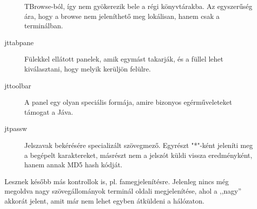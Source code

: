 \begin{description}
    TBrowse-ból, így nem gyökerezik bele a régi könyvtárakba.
    Az egyszerűség ára, hogy a browse nem jeleníthető meg lokálisan,
    hanem csak a terminálban.
\item[jttabpane]
    Fülekkel ellátott panelek, amik egymást takarják, és
    a füllel lehet kiválasztani, hogy melyik kerüljön felülre.
\item[jttoolbar]
    A panel egy olyan speciális formája, amire bizonyos 
    egérműveleteket támogat a Jáva.
\item[jtpassw]
    Jelszavak bekérésére specializált szövegmező. Egyrészt
    "*"-ként jeleníti meg a begépelt karaktereket, másrészt nem
    a jelszót küldi vissza eredményként, hanem annak MD5 hash kódját.
\end{description}
 
Lesznek később más kontrollok is, pl. famegjelenítésre.
Jelenleg nincs még megoldva nagy szövegállományok terminál oldali
megjelenítése, ahol a ,,nagy'' akkorát jelent, amit már nem lehet
egyben átküldeni a hálózaton.

 